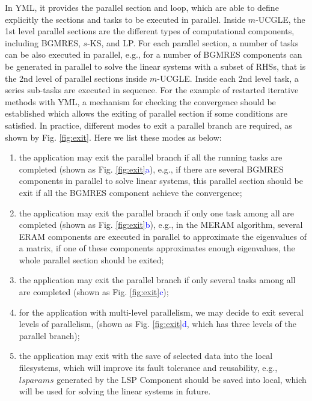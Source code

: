 In YML, it provides the parallel section and loop, which are able to define explicitly the sections and tasks to be executed in parallel. Inside $m$-UCGLE, the 1st level parallel sections are the different types of computational components, including BGMRES, $s$-KS, and LP. For each parallel section, a number of tasks can be also executed in parallel, e.g., for a number of BGMRES components can be generated in parallel to solve the linear systems with a subset of RHSs, that is the 2nd level of parallel sections inside $m$-UCGLE. Inside each 2nd level task, a series sub-tasks are executed in sequence. For the example of restarted iterative methods with YML, a mechanism for checking the convergence should be established which allows the exiting of parallel section if some conditions are satisfied.  In practice, different modes to exit a parallel branch are required, as shown by Fig. \ref{fig:exit}. Here we list these modes as below:

\begin{enumerate}[label=(\arabic*)]
	\item the application may exit the parallel branch if all the running tasks are completed (shown as Fig. \ref{fig:exit}\textcolor{blue}{a}), e.g., if there are several BGMRES components in parallel to solve linear systems, this parallel section should be exit if all the BGMRES component achieve the convergence;
	\item the application may exit the parallel branch if only one task among all are completed (shown as Fig. \ref{fig:exit}\textcolor{blue}{b}), e.g., in the MERAM algorithm, several ERAM components are executed in parallel to approximate the eigenvalues of a matrix, if one of these components approximates enough eigenvalues, the whole parallel section should be exited;
	\item the application may exit the parallel branch if only several tasks among all are completed (shown as Fig. \ref{fig:exit}\textcolor{blue}{c});
	\item for the application with multi-level parallelism, we may decide to exit several levels of parallelism, (shown as Fig. \ref{fig:exit}\textcolor{blue}{d}, which has three levels of the parallel branch);
	\item the application may exit with the save of selected data into the local filesystems, which will improve its fault tolerance and reusability, e.g., $lsparams$ generated by the LSP Component should be saved into local, which will be used for solving the linear systems in future.
\end{enumerate}

